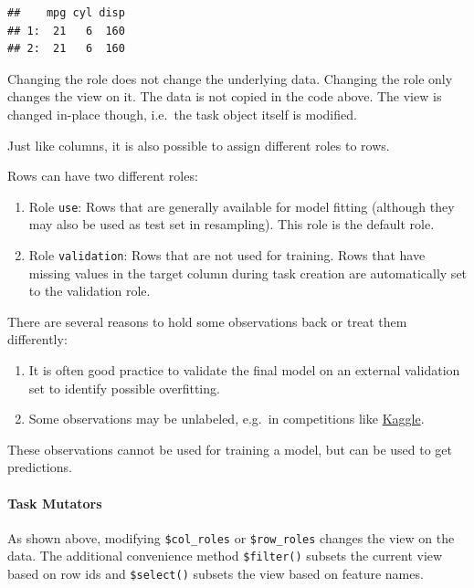 \documentclass[]{article}
\providecommand{\tightlist}{%
  \setlength{\itemsep}{0pt}\setlength{\parskip}{0pt}}
\let\oldparagraph\paragraph
\renewcommand{\paragraph}[1]{\oldparagraph{#1}\mbox{}}
\begin{document}
\begin{verbatim}
##    mpg cyl disp
## 1:  21   6  160
## 2:  21   6  160
\end{verbatim}

Changing the role does not change the underlying data.
Changing the role only changes the view on it.
The data is not copied in the code above.
The view is changed in-place though, i.e.~the task object itself is modified.

Just like columns, it is also possible to assign different roles to rows.

Rows can have two different roles:

\begin{enumerate}
\def\labelenumi{\arabic{enumi}.}
\item
  Role \texttt{use}:
  Rows that are generally available for model fitting (although they may also be used as test set in resampling).
  This role is the default role.
\item
  Role \texttt{validation}:
  Rows that are not used for training.
  Rows that have missing values in the target column during task creation are automatically set to the validation role.
\end{enumerate}

There are several reasons to hold some observations back or treat them differently:

\begin{enumerate}
\def\labelenumi{\arabic{enumi}.}
\tightlist
\item
  It is often good practice to validate the final model on an external validation set to identify possible overfitting.
\item
  Some observations may be unlabeled, e.g.~in competitions like \href{https://www.kaggle.com/}{Kaggle}.
\end{enumerate}

These observations cannot be used for training a model, but can be used to get predictions.

\hypertarget{tasks-mutators}{%
\paragraph{Task Mutators}\label{tasks-mutators}}

As shown above, modifying \texttt{\$col\_roles} or \texttt{\$row\_roles} changes the view on the data.
The additional convenience method \texttt{\$filter()} subsets the current view based on row ids and \texttt{\$select()} subsets the view based on feature names.
\end{document}
